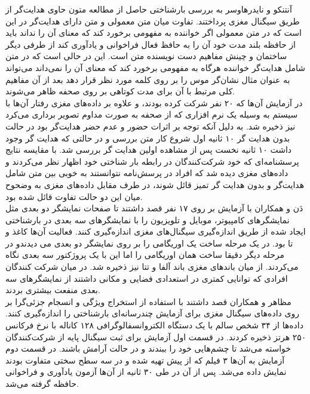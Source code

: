 آنتنکو و نایدرهاوسر
\cite{antonenko2010influence}
به بررسی بارشناختی حاصل از مطالعه متون حاوی هدایت‌گر از طریق سیگنال مغزی پرداختند. تفاوت میان متن معمولی و متن دارای هدایت‌گر در این است که در متن معمولی اگر خواننده به مفهومی برخورد کند که معنای آن را نداند باید از حافظه بلند مدت خود آن را به حافظ فعال فراخوانی و یادآوری کند از طرفی دیگر ساختمان و چینش مفاهیم دست نویسنده متن است. این در حالی است که در متن شامل هدایت‌گر خواننده هرگاه به مفهومی برخورد کند که معنای آن را نمی‌داند می‌تواند به عنوان مثال نشان‌گر موس را بر روی کلمه مورد نظر قرار دهد بعد از آن مفاهیم کلی مرتبط با آن برای مدت کوتاهی بر روی صحفه ظاهر می‌شوند.
\\
در آزمایش آن‌ها که ۲۰ نفر شرکت کرده بودند، و علاوه بر داده‌های مغزی رفتار آن‌ها با سیستم به وسیله یک نرم افزاری که از صحفه به صورت مداوم تصویر برداری می‌کرد نیز ذخیره شد. به دلیل آنکه توجه بر اثرات حضور و عدم حضر هدایت‌گر بود در حالت بدون هدایت گر ۱۰ ثانیه اول شروع کار متن بررسی و در حالتی که هدایت گر وجود داشت ۱۰ ثانیه نخست پس از مشاهده اولین هدایت گر بررسی شد. با مقایسه نتایج پرسشنامه‌ای که خود شرکت‌کنندگان در رابطه بار شناختی خود اظهار نظر می‌کردند و داده‌های مغزی دیده شد که افراد در پرسش‌نامه نتوانستند به خوبی بین متن شامل هدایت‌گر و بدون هدایت گر تمیز قائل شوند، در طرف مقابل داده‌های مغزی به وضحوح میان این دو حالت تفاوت قائل شده بود.
\\
دَن و همکاران
\cite{dan2017eeg}
با آزمایش بر روی ۱۷ نفر قصد داشتند تا صفحات نمایشگر دو بعدی مثل نمایشگر‌های کامپیوتر، موبایل و تلویزیون را با نمایشگر‌های سه بعدی در بارشناختی ایجاد شده از طریق اندازه‌گیری سیگنال‌های مغزی اندازه‌گیری کنند. فعالیت‌ آن‌ها کاغذ و تا بود. در یک مرحله ساخت یک اوریگامی را بر روی نمایشگر دو بعدی می دیدندو در مرحله دیگر دقیقا ساخت همان اوریگامی را اما این با یک پروژکتور سه بعدی نگاه می‌کردند. از میان باند‌های مغزی باند آلفا و تتا نیز ذخیره شد. در میان شرکت کنندگان افرادی که توانایی کمتری در استعدادی فضایی و مکانی داشتند از نمایشگر‌های سه بعدی منفعت بیشتری بردند.
\\
مظاهر و همکاران
\cite{mazher2017eeg}
قصد داشتند با استفاده از استخراج ویژگی و انسجام جزئی‌گرا
بر روی داده‌های سیگنال مغزی برای آزمایش چندرسانه‌ای بارشناختی را اندازه‌گیری کنند. داده‌ها از ۳۴ شخص سالم با یک دستگاه الکتروانسفالوگرافی ۱۲۸ کاناله با نرخ فرکانس ۲۵۰ هرتز ذخیره کردند.  در قسمت اول آزمایش برای ثبت سیگنال پایه
از شرکت‌کنندگان خواسته می‌شد تا چشم‌هایی خود را ببندند و در حالت آرامش باشند. در قسمت دوم آزمایش به آن‌ها ۳ فیلم که از پیش تهیه شده و در سه سطح سختی متفاوت بودند نمایش داده می‌شد. پس از آن در طی ۳۰ ثانیه از آن‌ها آزمون یادآوری و فراخوانی حافظه گرفته می‌شد.
